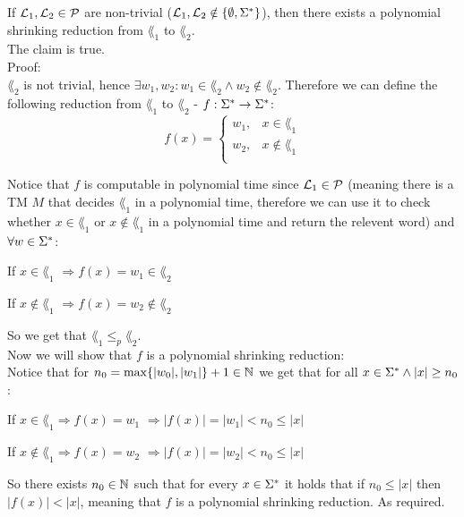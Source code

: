 If $\mathcal{L}_1, \mathcal{L}_2 \in \mathcal{P}$ are non-trivial ($\mathcal{L}_1, \mathcal{L}_2 \notin \{\emptyset, \Sigma^*\}$), then there exists a polynomial shrinking
reduction from $\lang_1$ to $\lang_2$. \\
The claim is true. \\

Proof: \\
$\lang_2$ is not trivial, hence $\exists w_1, w_2: w_1 \in \lang_2 \wedge w_2 \notin \lang_2$.
Therefore we can define the following reduction from $\lang_1$ to $\lang_2$ - $f: \Sigma^* \rightarrow \Sigma^*$:
\[
    f(x) =
    \begin{cases}
        w_1 , & x \in \lang_1    \\
        w_2 , & x \notin \lang_1 \\
    \end{cases}
\]

Notice that $f$ is computable in polynomial time since $\mathcal{L}_1 \in \mathcal{P}$ (meaning there is a TM
$M$ that decides $\lang_1$ in a polynomial time, therefore we can use it to check whether
$x \in \lang_1$ or $x \notin \lang_1$ in a polynomial time and return the relevent word) and $\forall w \in \Sigma^*$:

If $x \in \lang_1$
$\Longrightarrow f(x) = w_1 \in \lang_2$

If $x \notin \lang_1$
$\Longrightarrow f(x) = w_2 \notin \lang_2$

So we get that $\lang_1 \leq_p \lang_2$. \\

Now we will show that $f$ is a polynomial shrinking reduction: \\
Notice that for $n_0 = \max\{|w_0|, |w_1|\} + 1 \in \mathbb{N}$ we get that for all $x \in \Sigma^* \wedge |x| \geq n_0$:

If $x \in \lang_1 \Longrightarrow f(x) = w_1$
$\Longrightarrow |f(x)| = |w_1| < n_0 \leq |x|$

If $x \notin \lang_1 \Longrightarrow f(x) = w_2$
$\Longrightarrow |f(x)| = |w_2| < n_0 \leq |x|$

So there exists $n_0 \in \mathbb{N}$ such that for every $x \in \Sigma^*$ it holds that if $n_0 \leq |x|$ then $|f(x)| < |x|$,
meaning that $f$ is a polynomial shrinking reduction. As required.